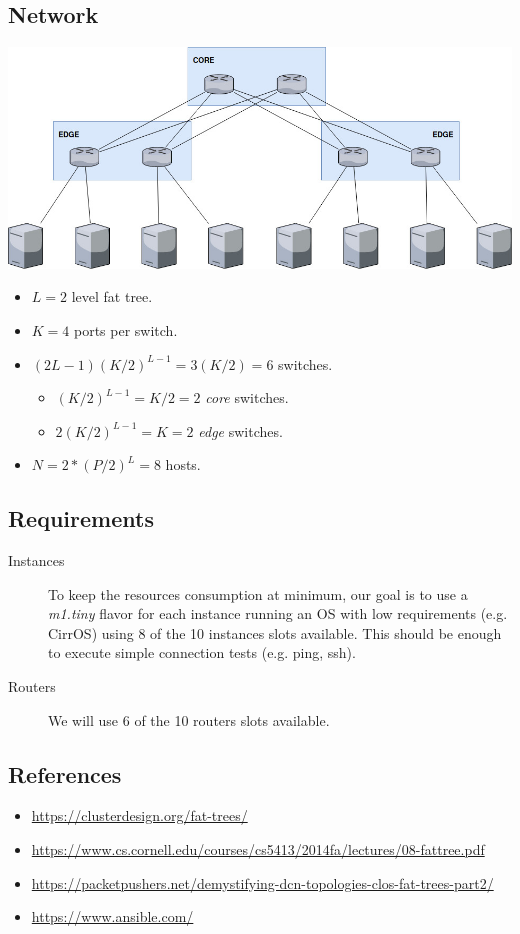 \documentclass[a4paper]{article}
\begin{document}
\subsection*{Network}
\label{sec-3-2}
\includegraphics[width=.9\linewidth]{./network.jpg}
\begin{itemize}
\item $L=2$ level fat tree.
\item $K=4$ ports per switch.
\item $(2L-1)(K/2)^{L-1}=3(K/2)=6$ switches.
\begin{itemize}
\item $(K/2)^{L-1}=K/2=2$ \emph{core} switches.
\item $2(K/2)^{L-1}=K=2$ \emph{edge} switches.
\end{itemize}
\item $N=2*(P/2)^L=8$ hosts.
\end{itemize}
\subsection*{Requirements}
\label{sec-3-3}
\begin{description}
\item[{Instances}] To keep the resources consumption at minimum, our goal
is to use a \emph{m1.tiny} flavor for each instance running
an OS with low requirements (e.g. CirrOS) using 8 of
the 10 instances slots available. This should be enough
to execute simple connection tests (e.g. ping, ssh).
\item[{Routers}] We will use 6 of the 10 routers slots available.
\end{description}
\subsection*{References}
\label{sec-3-4}
\begin{itemize}
\item \url{https://clusterdesign.org/fat-trees/}
\item \url{https://www.cs.cornell.edu/courses/cs5413/2014fa/lectures/08-fattree.pdf}
\item \url{https://packetpushers.net/demystifying-dcn-topologies-clos-fat-trees-part2/}
\item \url{https://www.ansible.com/}
\end{itemize}
\end{document}
